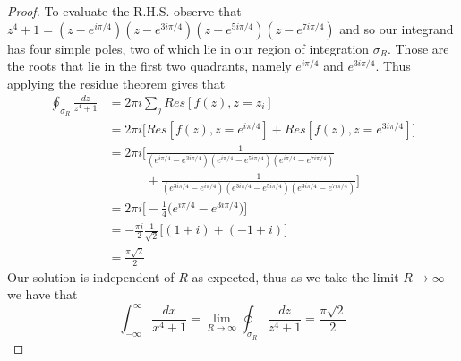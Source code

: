 \documentclass[a4paper, 11pt]{article}
\begin{document}
\begin{proof}
		
		\noindent To evaluate the R.H.S. observe that $z^4+1 = (z-e^{i\pi/4})(z-e^{3i\pi/4})(z-e^{5i\pi/4})(z-e^{7i\pi/4})$ and so our integrand has four simple poles, two of which lie in our region of integration $\sigma_R$. Those are the roots that lie in the first two quadrants, namely $e^{i\pi/4}$ and $e^{3i\pi/4}$. Thus applying the residue theorem gives that 
			\begin{align*}
				\oint_{\sigma_R}\frac{dz}{z^4+1} &= 2\pi i \sum_j Res[f(z), z=z_i] \\
					&= 2\pi i \Big[Res[f(z), z=e^{i\pi/4}]+Res[f(z), z=e^{3i\pi/4}]\Big] \\ 
					&= 2\pi i \Bigg[\frac{1}{(e^{i\pi/4}-e^{3i\pi/4})(e^{i\pi/4}-e^{5i\pi/4})(e^{i\pi/4}-e^{7i\pi/4})} \\
					&\quad \quad \quad+ \frac{1}{(e^{3i\pi/4}-e^{i\pi/4})(e^{3i\pi/4}-e^{5i\pi/4})(e^{3i\pi/4}-e^{7i\pi/4})}\Bigg] \\ 
					&= 2\pi i \Big[-\frac{1}{4}\Big(e^{i\pi/4}-e^{3i\pi/4}\Big)\Big] \\
					&= -\frac{\pi i}{2}\frac{1}{\sqrt{2}}\Big[(1+i)+(-1+i)\Big] \\ 
					&= \frac{\pi\sqrt{2}}{2}
			\end{align*}
		\noindent Our solution is independent of $R$ as expected, thus as we take the limit $R\to\infty$ we have that 
			\begin{equation*}
				\int_{-\infty}^{\infty}\frac{dx}{x^4+1} = \lim\limits_{R\to\infty}\oint_{\sigma_R}\frac{dz}{z^4+1} = \frac{\pi\sqrt{2}}{2}
			\end{equation*}
	\end{proof}
	
	
\end{document}
